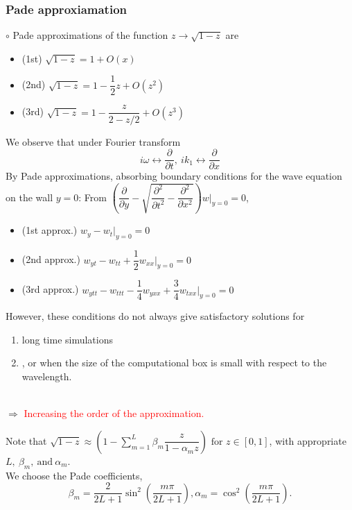 \documentclass{beamer}%
\begin{document}
\frame
{
\frametitle{Pade approxiamation}
\small
$\circ$ Pade approximations of the function $z \rightarrow \sqrt{1-z}$ are
\begin{itemize}
  \item (1st) $\sqrt{1-z}=1+O(x)$
  \item (2nd) $\sqrt{1-z}=1-\dfrac{1}{2}z+O(z^2)$
  \item (3rd) $\sqrt{1-z}=1-\dfrac{z}{2-z/2}+O(z^3)$
\end{itemize}


}

\frame
{
\small
\quad We observe that under Fourier transform
$$i\omega \leftrightarrow \dfrac{\partial}{\partial t}, ~ik_1 \leftrightarrow \dfrac{\partial}{\partial x}$$
\quad By Pade approximations, absorbing boundary conditions for the wave equation on the wall $y=0$:\newline
From $\left(\dfrac{\partial}{\partial y}-\sqrt{\dfrac{\partial^2}{\partial t^2}-\dfrac{\partial^2}{\partial x^2}}\right)w|_{y=0}=0$,
\begin{itemize}
  \item (1st approx.) $w_y-w_t|_{y=0}=0$
  \item (2nd approx.) $w_{yt}-w_{tt}+\dfrac{1}{2}w_{xx}|_{y=0}=0$
  \item (3rd approx.) $w_{ytt}-w_{ttt}-\dfrac{1}{4}w_{yxx}+\dfrac{3}{4}w_{txx}|_{y=0}=0$
\end{itemize}
}

\frame
{
\small
\quad However, these conditions do not always give satisfactory solutions for
\begin{enumerate}
  \item long time simulations
  \item , or when the size of the computational box is small with respect to the wavelength.
\end{enumerate}\\
$\Rightarrow$ \textcolor{red}{Increasing the order of the approximation.}

\vspace{10}
\quad Note that $\sqrt{1-z}\approx \left( 1- \displaystyle \sum_{m=1}^{L} \beta_m \dfrac{z}{1-\alpha_m z} \right) \text{ for } z\in[0,1]$, with appropriate $L, ~\beta_m,~ \text{and}~\alpha_m$.\\
\quad We choose the Pade coefficients,
$$\beta_m=\dfrac{2}{2L+1}\sin^2\left(\dfrac{m\pi}{2L+1}\right), \alpha_m=\cos^2\left(\dfrac{m\pi}{2L+1} \right).$$



}
\end{document}
